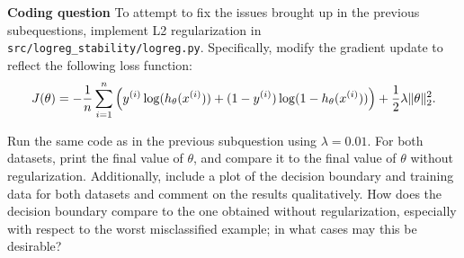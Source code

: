 \item {} \textbf{Coding question}
To attempt to fix the issues brought up in the previous subequestions, implement L2 regularization in \texttt{src/logreg\_stability/logreg.py}. Specifically, modify the gradient update to reflect the following loss function:
\begin{equation}
J(\theta)
	= -\frac{1}{{n}} \sum_{i=1}^{n} \left(y^{(i)}\log(h_{\theta}(x^{(i)}))
		+  (1 - y^{(i)})\log(1 - h_{\theta}(x^{(i)}))\right) + \frac{1}{2} \lambda \|\theta\|_2^2.
\end{equation}

Run the same code as in the previous subquestion using $\lambda = 0.01$. For both datasets, print the final value of $\theta$, and compare it to the final value of $\theta$ without regularization. Additionally, include a plot of the decision boundary and training data for both datasets and comment on the results qualitatively. How does the decision boundary compare to the one obtained without regularization, especially with respect to the worst misclassified example; in what cases may this be desirable?